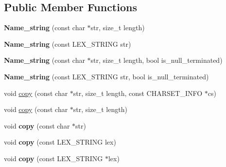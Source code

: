 \subsection*{Public Member Functions}
\begin{DoxyCompactItemize}
\item 
\mbox{\label{className__string_a44026000d5ba3f8a084e14450e080c8c}} 
{\bfseries Name\+\_\+string} (const char $\ast$str, size\+\_\+t length)
\item 
\mbox{\label{className__string_a845d1631eeaec52416c88e194d342f07}} 
{\bfseries Name\+\_\+string} (const L\+E\+X\+\_\+\+S\+T\+R\+I\+NG str)
\item 
\mbox{\label{className__string_acc4cce82c4e7bb1299957d8bc9279651}} 
{\bfseries Name\+\_\+string} (const char $\ast$str, size\+\_\+t length, bool is\+\_\+null\+\_\+terminated)
\item 
\mbox{\label{className__string_a764119d8ef321d7a518de55661cf1994}} 
{\bfseries Name\+\_\+string} (const L\+E\+X\+\_\+\+S\+T\+R\+I\+NG str, bool is\+\_\+null\+\_\+terminated)
\item 
void \mbox{\hyperlink{className__string_ad2f16ca58a7fd5438005f065d6daf345}{copy}} (const char $\ast$str, size\+\_\+t length, const C\+H\+A\+R\+S\+E\+T\+\_\+\+I\+N\+FO $\ast$cs)
\item 
void \mbox{\hyperlink{className__string_a9e0c169b1a92030ea8b43ab76984c604}{copy}} (const char $\ast$str, size\+\_\+t length)
\item 
\mbox{\label{className__string_a1f7e855487ded73485883757c5d8ca35}} 
void {\bfseries copy} (const char $\ast$str)
\item 
\mbox{\label{className__string_a4a602598bd71c1dd23f4916a425489f5}} 
void {\bfseries copy} (const L\+E\+X\+\_\+\+S\+T\+R\+I\+NG lex)
\item 
\mbox{\label{className__string_aeb48a495417534c81e33c580c37be336}} 
void {\bfseries copy} (const L\+E\+X\+\_\+\+S\+T\+R\+I\+NG $\ast$lex)
\item 
\mbox{\label{className__string_ae7d0a006ef9e8d8c1f2581684f8d319f}} 

\end{DoxyCompactItemize}
